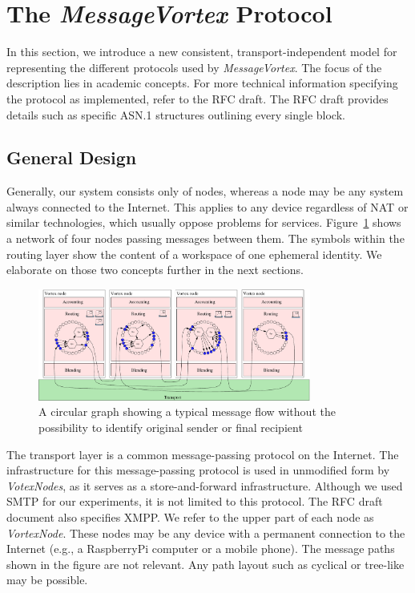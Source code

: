 \documentclass[acmsmall, screen, final, natbib=false]{acmart}
\begin{document}
	\section{The \emph{MessageVortex} Protocol\label{sec:protocol}}
	In this section, we introduce a new consistent, transport-independent model for representing the different protocols used by \emph{MessageVortex}. The focus of the description lies in academic concepts. For more technical information specifying the protocol as implemented, refer to the RFC draft\cite{MessageVortexRFC}. The RFC draft provides details such as specific ASN.1 structures outlining every single block.
	
	\subsection{General Design}
	Generally, our system consists only of nodes, whereas a node may be any system always connected to the Internet. This applies to any device regardless of NAT or similar technologies, which usually oppose problems for services. Figure~\ref{fig:protocolLayers} shows a network of four nodes passing messages between them. The symbols within the routing layer show the content of a workspace of one ephemeral identity. We elaborate on those two concepts further in the next sections. 
	
	\begin{figure}[ht]
		\centering\includegraphics[width=0.8\textwidth]{roughProtocolDesign}
		\caption{A circular graph showing a typical message flow without the possibility to identify original sender or final recipient}
		\label{fig:protocolLayers}
	\end{figure}
	
	The transport layer is a common message-passing protocol on the Internet. The infrastructure for this message-passing protocol is used in unmodified form by \emph{VotexNodes}, as it serves as a store-and-forward infrastructure. Although we used SMTP for our experiments, it is not limited to this protocol. The RFC draft document also specifies XMPP. We refer to the upper part of each node as \emph{VortexNode}. These nodes may be any device with a permanent connection to the Internet (e.g., a RaspberryPi computer or a mobile phone). The message paths shown in the figure are not relevant. Any path layout such as cyclical or tree-like may be possible.
	
\end{document}
